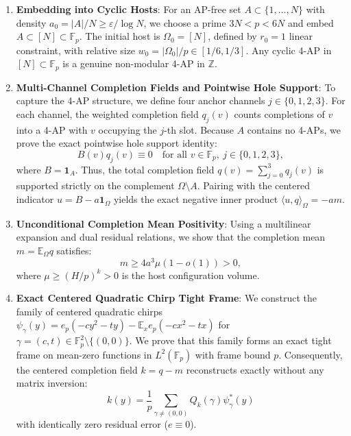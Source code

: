 \documentclass[11pt,reqno]{amsart}
\theoremstyle{plain}
\theoremstyle{definition}
\newcommand{\F}{\mathbb{F}}
\newcommand{\Z}{\mathbb{Z}}
\newcommand{\E}{\mathbb{E}}
\newcommand{\eps}{\varepsilon}
\newcommand{\one}{\mathbf{1}}
\begin{document}
\begin{enumerate}
\item \textbf{Embedding into Cyclic Hosts}:
For an AP-free set $A \subset \{1, \dots, N\}$ with density $a_0 = |A|/N \ge \eps / \log N$, we choose a prime $3N < p < 6N$ and embed $A \subset [N] \subset \F_p$.
The initial host is $\Omega_0 = [N]$, defined by $r_0 = 1$ linear constraint, with relative size $w_0 = |\Omega_0|/p \in [1/6, 1/3]$.
Any cyclic 4-AP in $[N] \subset \F_p$ is a genuine non-modular 4-AP in $\Z$.

\item \textbf{Multi-Channel Completion Fields and Pointwise Hole Support}:
To capture the 4-AP structure, we define four anchor channels $j \in \{0, 1, 2, 3\}$.
For each channel, the weighted completion field $q_j(v)$ counts completions of $v$ into a 4-AP with $v$ occupying the $j$-th slot.
Because $A$ contains no 4-APs, we prove the exact pointwise hole support identity:
\begin{equation}
B(v) q_j(v) \equiv 0 \quad \text{for all } v \in \F_p, \ j \in \{0, 1, 2, 3\},
\end{equation}
where $B = \one_A$. Thus, the total completion field $q(v) = \sum_{j=0}^3 q_j(v)$ is supported strictly on the complement $\Omega \setminus A$.
Pairing with the centered indicator $u = B - a \one_\Omega$ yields the exact negative inner product $\langle u, q \rangle_\Omega = -am$.

\item \textbf{Unconditional Completion Mean Positivity}:
Using a multilinear expansion and dual residual relations, we show that the completion mean $m = \E_\Omega q$ satisfies:
\begin{equation}
m \ge 4 a^3 \mu (1 - o(1)) > 0,
\end{equation}
where $\mu \ge (H/p)^k > 0$ is the host configuration volume.

\item \textbf{Exact Centered Quadratic Chirp Tight Frame}:
We construct the family of centered quadratic chirps $\psi_\gamma(y) = e_p(-cy^2 - ty) - \E_x e_p(-cx^2 - tx)$ for $\gamma = (c, t) \in \F_p^2 \setminus \{(0, 0)\}$.
We prove that this family forms an exact tight frame on mean-zero functions in $L^2(\F_p)$ with frame bound $p$.
Consequently, the centered completion field $k = q - m$ reconstructs exactly without any matrix inversion:
\begin{equation}
k(y) = \frac{1}{p} \sum_{\gamma \ne (0, 0)} Q_k(\gamma) \psi_\gamma^*(y)
\end{equation}
with identically zero residual error ($e \equiv 0$).


\end{enumerate}
\end{document}
